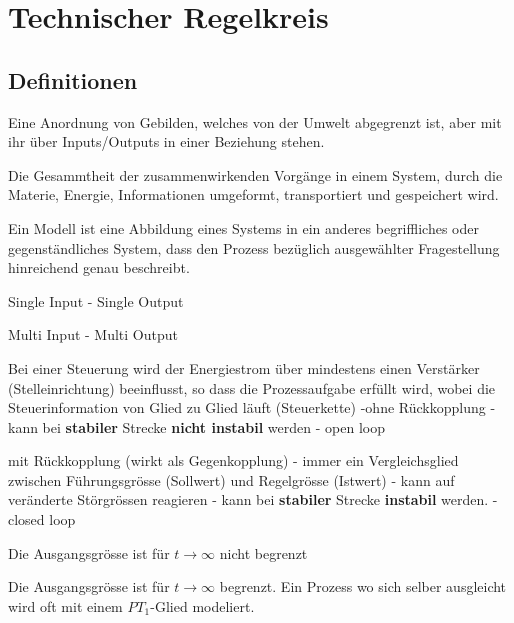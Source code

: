 \section{Technischer Regelkreis}
\subsection{Definitionen}

\begin{description}[leftmargin=2.5cm]
 \item[System]	Eine Anordnung von Gebilden, welches von der Umwelt abgegrenzt ist, aber
								mit ihr über Inputs/Outputs in einer Beziehung stehen.
 \item[Prozess] Die Gesammtheit der zusammenwirkenden Vorgänge in einem System,
        		durch die Materie, Energie, Informationen umgeformt, transportiert und
        		gespeichert wird.
 \item[Modell]	Ein Modell ist eine Abbildung eines Systems in ein anderes begriffliches oder
								gegenständliches System, dass den Prozess bezüglich ausgewählter Fragestellung
								hinreichend genau beschreibt.
 \item[SISO] Single Input - Single Output
 \item[MIMO] Multi Input - Multi Output
 \item[Steuerung]	Bei einer Steuerung wird der Energiestrom über mindestens einen Verstärker (Stelleinrichtung)
									beeinflusst, so dass die Prozessaufgabe erfüllt wird, wobei die Steuerinformation
									von Glied zu Glied läuft (Steuerkette) \newline
									-ohne Rückkopplung \newline
									- kann bei \textbf{stabiler} Strecke \textbf{nicht instabil} werden \newline
									- open loop
 \item[Regelung] mit Rückkopplung (wirkt als Gegenkopplung) \newline
 				 - immer ein Vergleichsglied zwischen Führungsgrösse (Sollwert) und
 				 Regelgrösse (Istwert) \newline
 				 - kann auf veränderte Störgrössen reagieren \newline
 				 - kann bei \textbf{stabiler} Strecke \textbf{instabil} werden. \newline
				 - closed loop
 \item[Prozess ohne Ausgleich]
				Die Ausgangsgrösse ist für $t \rightarrow \infty$ nicht begrenzt
 \item[Prozess mit Ausgleich]
				Die Ausgangsgrösse ist für $t \rightarrow \infty$ begrenzt. Ein Prozess wo sich selber ausgleicht wird oft
				mit einem $PT_1$-Glied modeliert.
				
\end{description}

